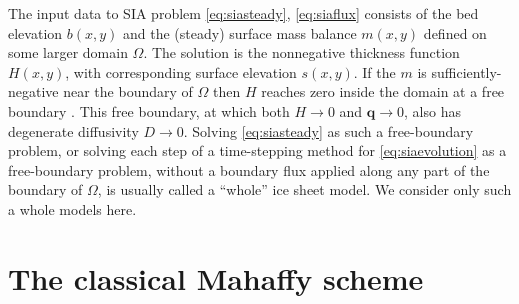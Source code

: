 \documentclass[twocolumn]{igs}
\newcommand\bq{\mathbf{q}}
\begin{document}
The input data to SIA problem \eqref{eq:siasteady}, \eqref{eq:siaflux} consists of the bed elevation $b(x,y)$ and the (steady) surface mass balance $m(x,y)$ defined on some larger domain $\Omega$.  The solution is the nonnegative thickness function $H(x,y)$, with corresponding surface elevation $s(x,y)$.  If the $m$ is sufficiently-negative near the boundary of $\Omega$ then $H$ reaches zero inside the domain at a free boundary \citep{JouvetBueler2012}.  This free boundary, at which both $H\to 0$ and $\bq \to 0$, also has degenerate diffusivity $D \to 0$.  Solving \eqref{eq:siasteady} as such a free-boundary problem, or solving each step of a time-stepping method for \eqref{eq:siaevolution} as a free-boundary problem, without a boundary flux applied along any part of the boundary of $\Omega$, is usually called a ``whole'' ice sheet model.  We consider only such a whole models here.


\section{The classical Mahaffy scheme}   \label{sec:mahaffyfd}
\end{document}
